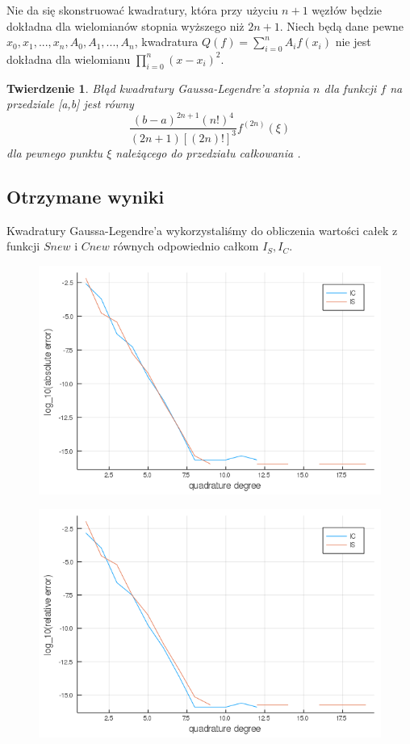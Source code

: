 \documentclass{article}
\newtheorem{theorem}{Twierdzenie}
\begin{document}
Nie da się skonstruować kwadratury, która przy użyciu $n+1$ węzłów będzie dokładna dla wielomianów stopnia wyższego niż $2n+1$. Niech będą dane pewne $x_0,x_1,...,x_n,A_0,A_1,...,A_n$, kwadratura $Q(f) = \sum_{i=0}^n A_if(x_i)$ nie jest dokładna dla wielomianu $\prod_{i=0}^n (x-x_i)^2$. \newline

\begin{theorem}
	Błąd kwadratury Gaussa-Legendre'a stopnia $n$ dla funkcji $f$ na przedziale [a,b] jest równy \[
		\frac{(b-a)^{2n+1}(n!)^4}{(2n+1)[(2n)!]^3}f^{(2n)}(\xi) \]
dla pewnego punktu $\xi$ należącego do przedziału całkowania \cite{khaner}.
\end{theorem}

\subsection*{Otrzymane wyniki}
	Kwadratury Gaussa-Legendre'a wykorzystaliśmy do obliczenia wartości całek z funkcji $Snew$ i $Cnew$ równych odpowiednio całkom $I_S,I_C$.


\begin{figure}[ht]
    \includegraphics[scale=0.5]{WykresD1logabsolute.png}
    \label{wykresDabsolute}
\end{figure}
\begin{figure}[ht]
    \includegraphics[scale=0.5]{WykresD1logrelative.png}
    \label{wykresDrel}
\end{figure}
\end{document}

